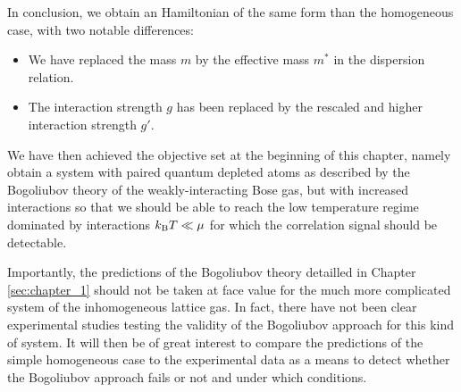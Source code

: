 In conclusion, we obtain an Hamiltonian of the same form than the homogeneous case, with two notable differences:

\begin{itemize}
    \item We have replaced the mass $m$ by the effective mass $m^*$ in the dispersion relation.
    \item The interaction strength $g$ has been replaced by the rescaled and higher interaction strength $g'$.
\end{itemize}

We have then achieved the objective set at the beginning of this chapter, namely obtain a system with \kmk paired quantum depleted atoms as described by the Bogoliubov theory of the weakly-interacting Bose gas, but with increased interactions so that we should be able to reach the low temperature regime dominated by interactions $k_{\mathrm{B}} T \ll \mu$ for which the \kmk correlation signal should be detectable. 

Importantly, the predictions of the Bogoliubov theory detailled in Chapter \ref{sec:chapter_1} should not be taken at face value for the much more complicated system of the inhomogeneous lattice gas. In fact, there have not been clear experimental studies testing the validity of the Bogoliubov approach for this kind of system. It will then be of great interest to compare the predictions of the simple homogeneous case to the experimental data as a means to detect whether the Bogoliubov approach fails or not and under which conditions.



